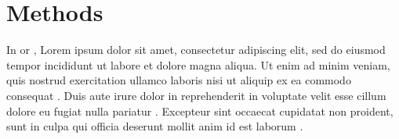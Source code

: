 \chapter{Methods}
\label{chap:methods}

In  or ,
Lorem ipsum dolor sit amet, consectetur adipiscing elit, sed do eiusmod tempor incididunt ut labore et dolore magna aliqua. Ut enim ad minim veniam, quis nostrud exercitation ullamco laboris nisi ut aliquip ex ea commodo consequat \cite{ref1}. Duis aute irure dolor in reprehenderit in voluptate velit esse cillum dolore eu fugiat nulla pariatur \cite{ref2}. Excepteur sint occaecat cupidatat non proident, sunt in culpa qui officia deserunt mollit anim id est laborum \cite{ref3}.



